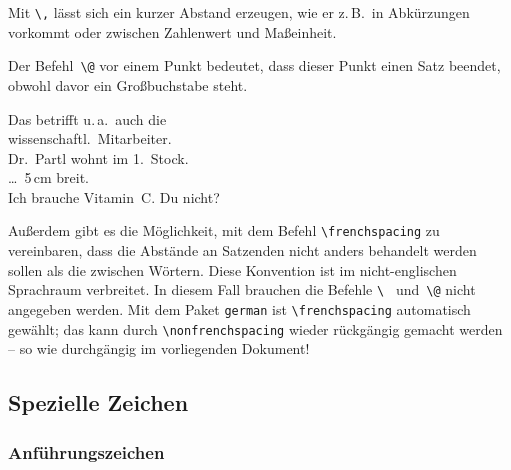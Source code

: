 Mit \lstinline|\,| lässt sich ein kurzer Abstand erzeugen, wie er
z.\,B.\ in Abkürzungen vorkommt oder zwischen Zahlenwert und Maßeinheit.

Der Befehl~\lstinline|\@| vor einem Punkt bedeutet, dass dieser Punkt
einen Satz beendet, obwohl davor ein Großbuchstabe steht.

\begin{LTXexample}
Das betrifft u.\,a.\ auch die \\
wissenschaftl.\ Mitarbeiter. \\
Dr.~Partl wohnt im 1.~Stock. \\
\dots\ 5\,cm breit. \\
Ich brauche Vitamin~C\@.
Du nicht?
\end{LTXexample}

 
Außerdem gibt es die Möglichkeit, mit dem Befehl
\lstinline|\frenchspacing|
zu vereinbaren, dass die Abstände an Satzenden nicht anders
behandelt werden sollen als die zwischen Wörtern.
Diese Konvention ist im nicht-englischen Sprachraum verbreitet.
In diesem Fall brauchen die Befehle \lstinline|\ | und~\lstinline|\@| nicht
angegeben werden.
Mit dem Paket \texttt{german}  ist \lstinline:\frenchspacing:
automatisch gewählt; das kann durch
\lstinline:\nonfrenchspacing:
wieder rückgängig gemacht werden -- so wie durchgängig im vorliegenden
Dokument!

 

\subsection{Spezielle Zeichen} \label{spezial}
 
\subsubsection{Anführungszeichen} \label{quotes}
 
